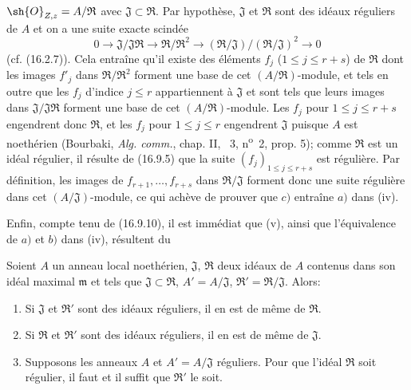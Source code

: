 $\sh{O}_{Z,z}=A/\mathfrak R$ avec $\mathfrak J\subset\mathfrak R$. Par hypothèse, $\mathfrak J$ et $\mathfrak R$ sont des idéaux réguliers de $A$ et on a une suite exacte scindée
\[
  0\longrightarrow\mathfrak J/\mathfrak J\mathfrak R\longrightarrow\mathfrak R/\mathfrak R^2\longrightarrow(\mathfrak R/\mathfrak J)/(\mathfrak R/\mathfrak J)^2\longrightarrow0
\]
(cf. (16.2.7)). Cela entraîne qu'il existe des éléments $f_j$ ($1\leq j\leq r+s$) de $\mathfrak R$ dont les images $f'_j$ dans $\mathfrak R/\mathfrak R^2$ forment une base de cet $(A/\mathfrak R)$-module, et tels en outre que les $f_j$ d'indice $j\leq r$ appartiennent à $\mathfrak J$ et sont tels que leurs images dans $\mathfrak J/\mathfrak J\mathfrak R$ forment une base de cet $(A/\mathfrak R)$-module. Les $f_j$ pour $1\leq j\leq r+s$ engendrent donc $\mathfrak R$, et les $f_j$ pour $1\leq j\leq r$ engendrent $\mathfrak J$ puisque $A$ est noethérien (Bourbaki, \emph{Alg. comm.}, chap. II, \textsection~3, n\textsuperscript{o}~2, prop. 5); comme $\mathfrak R$ est un idéal régulier, il résulte de (16.9.5) que la suite $(f_j)_{1\leq j\leq r+s}$ est régulière. Par définition, les images de $f_{r+1},\ldots,f_{r+s}$ dans $\mathfrak R/\mathfrak J$ forment donc une suite régulière dans cet $(A/\mathfrak J)$-module, ce qui achève de prouver que $c)$ entraîne $a)$ dans (iv).

Enfin, compte tenu de (16.9.10), il est immédiat que (v), ainsi que l'équivalence de $a)$ et $b)$ dans (iv), résultent du

\begin{corollary}[19.1.6]
\label{IV.19.1.6}
Soient $A$ un anneau local noethérien, $\mathfrak J$, $\mathfrak R$ deux idéaux de $A$ contenus dans son idéal maximal $\mathfrak m$ et tels que $\mathfrak J\subset\mathfrak R$, $A'=A/\mathfrak J$, $\mathfrak R'=\mathfrak R/\mathfrak J$. Alors:
\begin{enumerate}
  \item[(i)] Si $\mathfrak J$ et $\mathfrak R'$ sont des idéaux réguliers, il en est de même de $\mathfrak R$.
  \item[(ii)] Si $\mathfrak R$ et $\mathfrak R'$ sont des idéaux réguliers, il en est de même de $\mathfrak J$.
  \item[(iii)] Supposons les anneaux $A$ et $A'=A/\mathfrak J$ réguliers. Pour que l'idéal $\mathfrak R$ soit régulier, il faut et il suffit que $\mathfrak R'$ le soit.
\end{enumerate}
\end{corollary}

